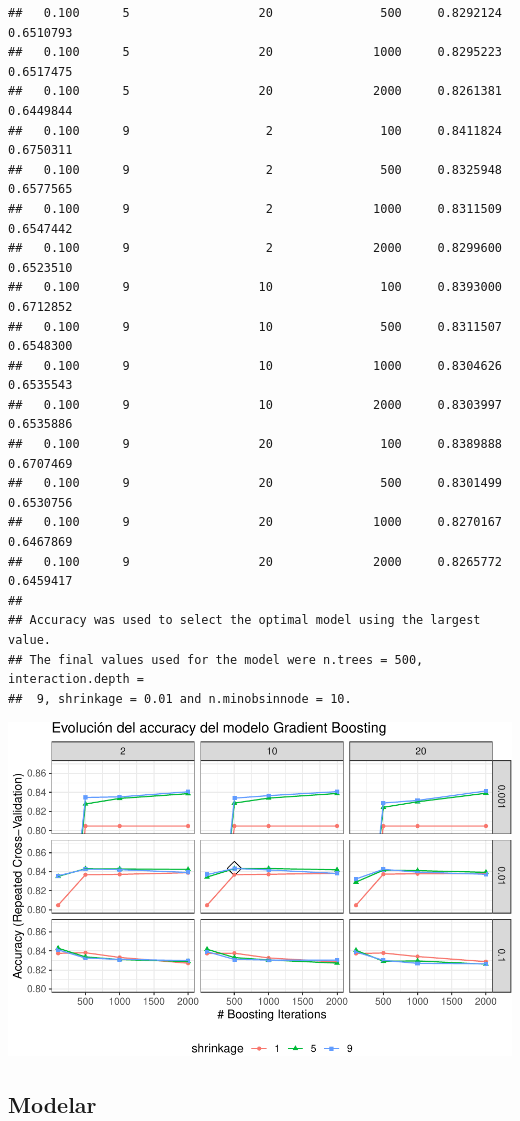 \documentclass[]{article}
\begin{document}
\begin{lstlisting}
##   0.100      5                  20               500     0.8292124  0.6510793
##   0.100      5                  20              1000     0.8295223  0.6517475
##   0.100      5                  20              2000     0.8261381  0.6449844
##   0.100      9                   2               100     0.8411824  0.6750311
##   0.100      9                   2               500     0.8325948  0.6577565
##   0.100      9                   2              1000     0.8311509  0.6547442
##   0.100      9                   2              2000     0.8299600  0.6523510
##   0.100      9                  10               100     0.8393000  0.6712852
##   0.100      9                  10               500     0.8311507  0.6548300
##   0.100      9                  10              1000     0.8304626  0.6535543
##   0.100      9                  10              2000     0.8303997  0.6535886
##   0.100      9                  20               100     0.8389888  0.6707469
##   0.100      9                  20               500     0.8301499  0.6530756
##   0.100      9                  20              1000     0.8270167  0.6467869
##   0.100      9                  20              2000     0.8265772  0.6459417
## 
## Accuracy was used to select the optimal model using the largest value.
## The final values used for the model were n.trees = 500, interaction.depth =
##  9, shrinkage = 0.01 and n.minobsinnode = 10.
\end{lstlisting}

\includegraphics{analisis_de_muchos_modelos_files/figure-latex/unnamed-chunk-28-1.pdf}

\hypertarget{modelar-6}{%
\subsection{Modelar}\label{modelar-6}}
\end{document}
